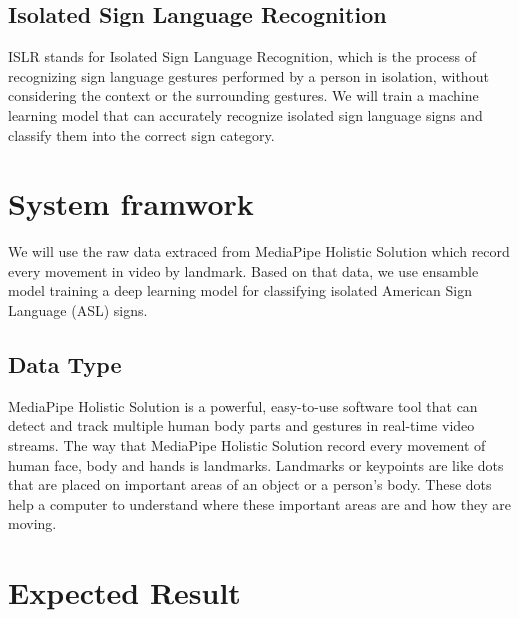 \documentclass[10pt,twocolumn,letterpaper]{article}
\begin{document}
\begin{CJK*}{UTF8}{bsmi}
\subsection{Isolated Sign Language Recognition}

ISLR stands for Isolated Sign Language Recognition, 
which is the process of recognizing sign language gestures performed by a person in isolation, 
without considering the context or the surrounding gestures. 
We will train a machine learning model that can accurately recognize isolated sign language signs and classify them into the correct sign category.

\section{System framwork}
\label{sec:formatting}

We will use the raw data extraced from MediaPipe Holistic Solution which record every movement in video by landmark.
Based on that data, we use ensamble model training a deep learning model for classifying isolated American Sign Language (ASL) signs.

\subsection{Data Type}

MediaPipe Holistic Solution is a powerful, easy-to-use software tool that can detect and track multiple human body parts and gestures in real-time video streams. 
The way that MediaPipe Holistic Solution record every movement of human face, body and hands is landmarks.
Landmarks or keypoints are like dots that are placed on important areas of an object or a person's body. 
These dots help a computer to understand where these important areas are and how they are moving.

\section{Expected Result}




% 
% 

\end{CJK*}
\end{document}
